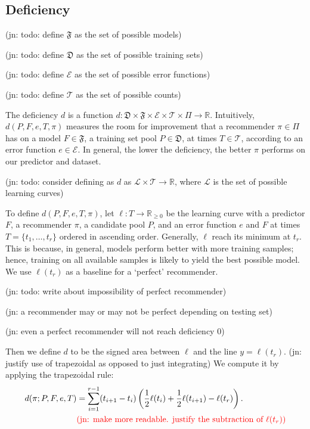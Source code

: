 \documentclass[11pt,twoside]{report}
\newcommand\bbR{\mathbb{R}}
\newcommand\cE{\mathcal{E}}
\newcommand\cL{\mathcal{L}}
\newcommand\cT{\mathcal{T}}
\newcommand\fD{\mathfrak{D}}
\newcommand\fF{\mathfrak{F}}
\newcommand\jn[1]{{\color{red}(jn: #1)}}
\begin{document}
\subsection{Deficiency}

\jn{todo: define $\fF$ as the set of possible models}

\jn{todo: define $\fD$ as the set of possible training sets}

\jn{todo: define $\cE$ as the set of possible error functions}

\jn{todo: define $\cT$ as the set of possible counts}

The deficiency $d$ is a function $d : \fD \times \fF \times \cE \times \cT \times \Pi \to \bbR$. Intuitively, $d(P, F, e, T, \pi)$ measures the room for improvement that a recommender $\pi \in \Pi$ has on a model $F \in \fF$, a training set pool $P \in \fD$, at times $T \in \cT$, according to an error function $e \in \cE$. In general, the lower the deficiency, the better $\pi$ performs on our predictor and dataset.

\jn{todo: consider defining as $d$ as $\cL \times \cT \to \bbR$, where $\cL$ is the set of possible learning curves}

To define $d(P, F, e, T, \pi)$, let $\ell : T \to \bbR_{\geq0}$ be the learning curve with a predictor $F$, a recommender $\pi$, a candidate pool $P$, and an error function $e$ and $F$ at times $T = \{t_1, \dots, t_r\}$ ordered in ascending order. Generally, $\ell$ reach its minimum at $t_r$. This is because, in general, models perform better with more training samples; hence, training on all available samples is likely to yield the best possible model. We use $\ell(t_r)$ as a baseline for a `perfect' recommender.

\jn{todo: write about impossibility of perfect recommender}

\jn{a recommender may or may not be perfect depending on testing set}

\jn{even a perfect recommender will not reach deficiency $0$}

Then we define $d$ to be the signed area between $\ell$ and the line $y = \ell(t_r)$. \jn{justify use of trapezoidal as opposed to just integrating} We compute it by applying the trapezoidal rule: \begin{align*}
  d(\pi; P, F, e, T) &= \sum_{i=1}^{r-1} (t_{i+1} - t_i)\left(\frac12\ell(t_i) + \frac12\ell(t_{i+1}) - \ell(t_r)\right) \text.
  \\&\text{\jn{make more readable. justify the subtraction of $\ell(t_r)$}}
\end{align*}
\end{document}
